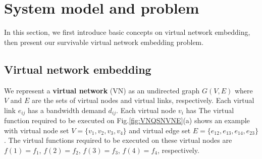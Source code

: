  \section{System model and problem}
\label{sec:Problem description}
In this section, we first introduce  basic concepts on virtual network embedding, then present our survivable virtual network embedding problem.


\subsection{Virtual network embedding}


We represent a \textbf{virtual network} (VN) as an undirected graph $G (V,E)$ where $V$ and  $E$ are the sets of virtual nodes and virtual links, respectively. Each virtual link $e_{ij}$ has a bandwidth demand $d_{ij}$. Each virtual node  $v_i$ has   The virtual function required to be executed on  Fig.\ref{fig:VNQSNVNE}(a) shows an example  with virtual node set $V=\{v_1,v_2,v_3,v_4\}$ and virtual edge set $E= \{e_{12},e_{13},e_{14},e_{23}\}$. The virtual functions required to be executed on these virtual nodes are  $f(1)=f_1$, $f(2)=f_2$, $f(3)=f_3$, $f(4)=f_4$, respectively.

